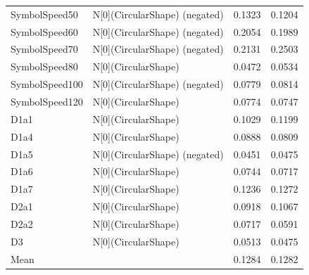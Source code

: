 \begin{tabular}{llll}
SymbolSpeed50 & N[0](CircularShape) (negated) & 0.1323 & 0.1204 \\
SymbolSpeed60 & N[0](CircularShape) (negated) & 0.2054 & 0.1989 \\
SymbolSpeed70 & N[0](CircularShape) (negated) & 0.2131 & 0.2503 \\
SymbolSpeed80 & N[0](CircularShape) & 0.0472 & 0.0534 \\
SymbolSpeed100 & N[0](CircularShape) (negated) & 0.0779 & 0.0814 \\
SymbolSpeed120 & N[0](CircularShape) & 0.0774 & 0.0747 \\
D1a1 & N[0](CircularShape) & 0.1029 & 0.1199 \\
D1a4 & N[0](CircularShape) & 0.0888 & 0.0809 \\
D1a5 & N[0](CircularShape) (negated) & 0.0451 & 0.0475 \\
D1a6 & N[0](CircularShape) & 0.0744 & 0.0717 \\
D1a7 & N[0](CircularShape) & 0.1236 & 0.1272 \\
D2a1 & N[0](CircularShape) & 0.0918 & 0.1067 \\
D2a2 & N[0](CircularShape) & 0.0717 & 0.0591 \\
D3 & N[0](CircularShape) & 0.0513 & 0.0475 \\
Mean &  & 0.1284 & 0.1282 \\
\bottomrule
\end{tabular}
